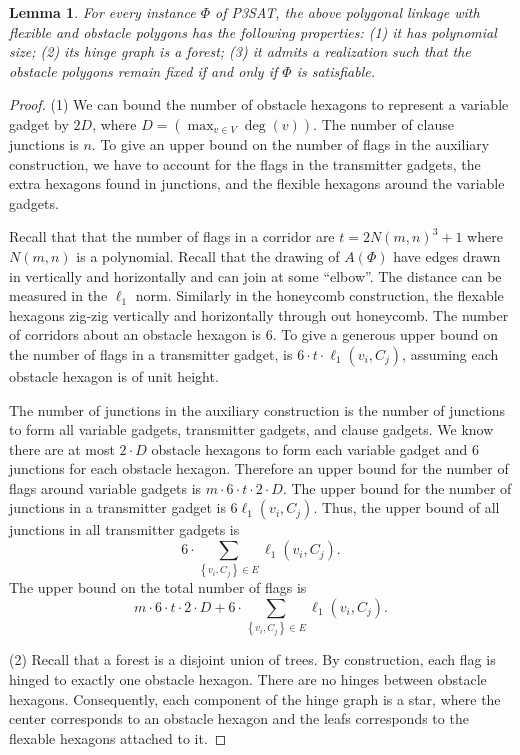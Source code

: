 \documentclass[10pt]{CSUNthesis}
\theoremstyle{plain}%
\newtheorem{lem}{Lemma}
\theoremstyle{definition}
\theoremstyle{remark}
\newcommand{\lr}[1]{\left( #1 \right)}
\begin{document}
\begin{lem}\label{lem:aux-A}
For every instance $\Phi$ of P3SAT, the above polygonal linkage with flexible and obstacle polygons has the following properties: (1) it has polynomial size; (2) its hinge graph is a forest;
(3) it admits a realization such that the obstacle polygons remain fixed if and only if $\Phi$ is satisfiable.
\end{lem}
\begin{proof}

\noindent (1) We can bound the number of obstacle hexagons to represent a variable gadget by $2 D$, where $D = \lr{ \max_{v \in V} \deg (v)}$.  
The number of clause junctions is $n$.
To give an upper bound on the number of flags in the auxiliary construction, we have to account for the flags in the transmitter gadgets, the extra hexagons found in junctions, and the flexible hexagons around the variable gadgets.

Recall that that the number of flags in a corridor are $ t = 2N(m,n)^3 + 1 $ where $N(m,n)$ is a polynomial. 
Recall that the drawing of $A(\Phi)$ have edges drawn in vertically and horizontally and can join at some ``elbow''.  
The distance can be measured in the $\ell_1$ norm.
Similarly in the honeycomb construction, the flexable hexagons zig-zig vertically and horizontally through out honeycomb.  
The number of corridors about an obstacle hexagon is $6$.
To give a generous upper bound on the number of flags in a transmitter gadget, is $6 \cdot t \cdot \ell_1\lr{v_i,C_j}$, assuming each obstacle hexagon is of unit height.

The number of junctions in the auxiliary construction is the number of junctions to form all variable gadgets, transmitter gadgets, and clause gadgets. 
We know there are at most $2 \cdot D$ obstacle hexagons to form each variable gadget and $6$ junctions for each obstacle hexagon.  
Therefore an upper bound for the number of flags around variable gadgets is $m \cdot 6 \cdot t \cdot 2 \cdot D$.
The upper bound for the number of junctions in a transmitter gadget is $6 \ell_1 \lr{v_i, C_j}$.  
Thus, the upper bound of all junctions in all transmitter gadgets is $$6 \cdot \sum_{\left\lbrace v_i, C_j \right\rbrace \in E} \ell_1 \lr{v_i, C_j}.$$
The upper bound on the total number of flags is
$$m \cdot 6 \cdot t \cdot 2 \cdot D + 6 \cdot \sum_{\left\lbrace v_i, C_j \right\rbrace \in E} \ell_1 \lr{v_i, C_j}.$$

\noindent (2) Recall that a forest is a disjoint union of trees. 
By construction, each flag is hinged to exactly one obstacle hexagon.  
There are no hinges between obstacle hexagons.
Consequently, each component of the hinge graph is a star, where the center corresponds to an obstacle hexagon and the leafs corresponds to the flexable hexagons attached to it.


\end{proof}
\end{document}
